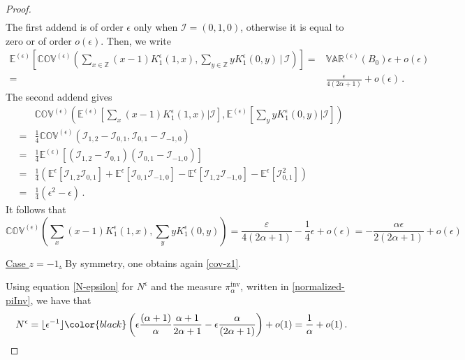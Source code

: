 \documentclass[a4paper,11pt,oneside,reqno]{amsart}
\theoremstyle{definition}
\newcommand{\eps}{\varepsilon}
\numberwithin{equation}{section}
\begin{document}
\begin{proof}
\begin{multline*}
\end{multline*}
The first addend is of order $\epsilon$ only when $\bm{\mathcal{I}}=(0,1,0)$, otherwise it is equal to zero or of order $o(\epsilon)$. Then, we write
\begin{equation}
	\begin{split}
		\mathbb{E}^{(\epsilon)}\left[\mathbb{COV}^{(\epsilon)}\left(\sum_{x\in \mathbb{Z}}(x-1)K_{1}^{\epsilon}(1,x),\sum_{y\in \mathbb{Z}}yK_{1}^{\epsilon}(0,y)\,\bigg|\,\bm{\mathcal{I}}\right)\right]=&
		\mathbb{VAR}^{(\epsilon)}(B_{0})\epsilon+o(\epsilon)
		\\=&
		\frac{\epsilon}{4(2\alpha+1)}+o(\epsilon)\,.
	\end{split}
\end{equation}
{\color{black}The second addend gives 
	\begin{equation}
		\begin{split}
			&\mathbb{COV}^{(\epsilon)}\left(\mathbb{E}^{(\epsilon)}\left[\sum_{x}(x-1)K_{1}^{\epsilon}(1,x)\bigg|\mathbf{\mathcal{I}}\right],\mathbb{E}^{(\epsilon)}\left[\sum_{y}yK_{1}^{\epsilon}(0,y)\bigg|\mathbf{\mathcal{I}}\right]\right) 
			\\=& \frac{1}{4}\mathbb{COV}^{(\epsilon)}\left(\mathcal{I}_{1,2}-\mathcal{I}_{0,1},\mathcal{I}_{0,1}-\mathcal{I}_{-1,0}\right)
			\\=&
			\frac{1}{4}\mathbb{E}^{(\epsilon)}\left[(\mathcal{I}_{1,2}-\mathcal{I}_{0,1})(\mathcal{I}_{0,1}-\mathcal{I}_{-1,0})\right]
			\\=& 
			\frac{1}{4}\left(\mathbb{E}^{\epsilon}[\mathcal{I}_{1,2}\mathcal{I}_{0,1}]+\mathbb{E}^{\epsilon}[\mathcal{I}_{0,1}\mathcal{I}_{-1,0}]-\mathbb{E}^{\epsilon}[\mathcal{I}_{1,2}\mathcal{I}_{-1,0}]-\mathbb{E}^{\epsilon}[\mathcal{I}_{0,1}^{2}]\right)
			\\=&
			\frac{1}{4}(\epsilon^{2}-\epsilon)\,.
		\end{split}
	\end{equation}
	It follows that 
	\begin{equation}\label{cov-z1}
		\mathbb{COV}^{(\epsilon)}\left(\sum_{x}(x-1)K_{1}^{\epsilon}(1,x),\sum_{y}yK_{1}^{\epsilon}(0,y)\right)= \frac{\eps
		}{4(2\alpha+1)}-\frac{1}{4}\epsilon+o(\epsilon)= -\frac{\alpha \epsilon}{2(2\alpha+1)}+o(\epsilon)
	\end{equation}}
\item{\underline{Case $z=-1$.}} By symmetry, one obtains again \eqref{cov-z1}. 

Using equation \eqref{N-epsilon} for $N^{\epsilon}$ and the measure $\pi^{\text{inv}}_{\alpha}$, written in \eqref{normalized-piInv}, we have that 
\begin{equation}\label{numerator-approx-final}
	N^{\epsilon}=\lfloor\epsilon^{-1}\rfloor
{\color{black}	\left(\epsilon \frac{(\alpha+1)}{\alpha}\frac{\alpha+1}{2\alpha+1}-\epsilon\frac{\alpha}{(2\alpha+1)}\right)+o(1)}
	=\frac{1}{\alpha}+o(1)\,.
\end{equation}


\end{proof}
\end{document}
